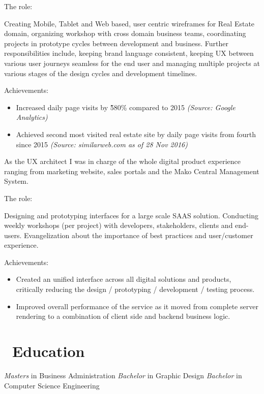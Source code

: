 \documentclass{resume}
\begin{document}
  {The role:}

  Creating Mobile, Tablet and Web based, user centric wireframes for Real Estate domain, organizing workshop with cross domain business teams, coordinating projects in prototype cycles between development and business. Further responsibilities include, keeping brand language consistent, keeping UX between various user journeys seamless for the end user and managing multiple projects at various stages of the design cycles and development timelines.\par

  {Achievements:}

  \begin{itemize}
    \item Increased daily page visits by \~580\% compared to 2015 \textit{(Source: Google Analytics)}
    \item Achieved second most visited real estate site by daily page visits from fourth since 2015 \textit{(Source: similarweb.com as of 28 Nov 2016)}
  \end{itemize}
  As the UX architect I was in charge of the whole digital product experience ranging from marketing website, sales portals and the Mako Central Management System.\par

  {The role:}

  Designing and prototyping interfaces for a large scale SAAS solution. Conducting weekly workshops (per project) with developers, stakeholders, clients and end-users. Evangelization about the importance of best practices and user/customer experience.\par

  {Achievements:}

\begin{itemize}
  \item Created an unified interface across all digital solutions and products, critically reducing the design / prototyping / development / testing process.
  \item Improved overall performance of the service as it moved from complete server rendering to a combination of client side and backend business logic.
\end{itemize}

\section{\faGraduationCap\ Education}
\textit{Masters} in Business Administration
\textit{Bachelor} in Graphic Design
\textit{Bachelor} in Computer Science Engineering
\end{document}

